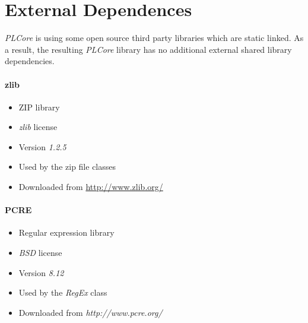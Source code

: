 \section{External Dependences}
\emph{PLCore} is using some open source third party libraries which are static linked. As a result, the resulting \emph{PLCore} library has no additional external shared library dependencies.


\paragraph{zlib}
\begin{itemize}
\item ZIP library
\item \emph{zlib} license
\item Version \emph{1.2.5}
\item Used by the zip file classes
\item Downloaded from \url{http://www.zlib.org/}
\end{itemize}


\paragraph{PCRE}
\begin{itemize}
\item Regular expression library
\item \emph{BSD} license
\item Version \emph{8.12}
\item Used by the \emph{RegEx} class
\item Downloaded from \emph{http://www.pcre.org/}
\end{itemize}





\cleardoublepage

\cleardoublepage

\cleardoublepage

\cleardoublepage

\cleardoublepage

\cleardoublepage

\cleardoublepage

\cleardoublepage

\cleardoublepage
